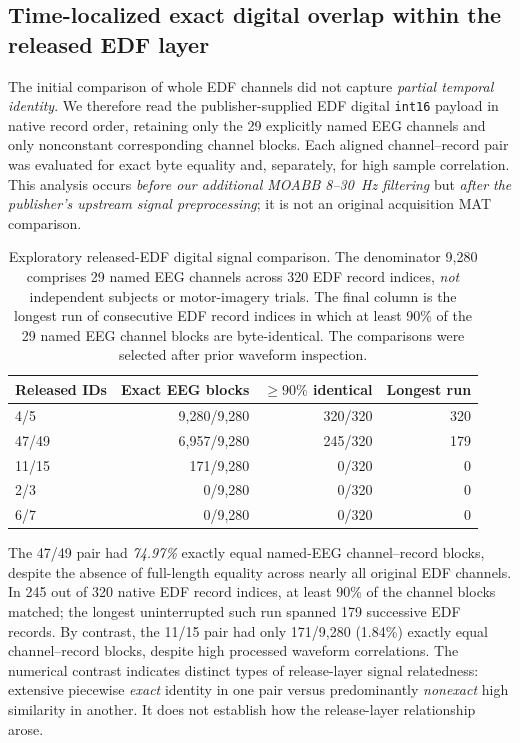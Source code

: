 \subsection{Time-localized exact digital overlap within the released EDF layer}
\label{sec:p2-time-localised-block-overlap}
The initial comparison of whole EDF channels did not capture
\emph{partial temporal identity}. We therefore read the
publisher-supplied EDF digital \texttt{int16} payload in
native record order, retaining only the 29 explicitly named EEG
channels and only nonconstant corresponding channel blocks.
Each aligned channel--record pair was evaluated for exact
byte equality and, separately, for high sample correlation.
This analysis occurs \emph{before our additional MOABB
8--30~Hz filtering} but \emph{after the publisher's
upstream signal preprocessing}; it is not an original
acquisition MAT comparison.

\begin{table}[tb]
\centering\small
\caption{Exploratory released-EDF digital signal comparison.
The denominator 9,280 comprises 29 named EEG channels across
320 EDF record indices, \emph{not} independent subjects or
motor-imagery trials. The final column is the longest run
of consecutive EDF record indices in which at least
90\% of the 29 named EEG channel blocks are byte-identical.
The comparisons were selected after prior waveform inspection.}
\label{tab:p2-temporal-exact-edf}
\setlength{\tabcolsep}{4pt}
\begin{tabular}{lrrr}
\toprule
Released IDs & Exact EEG blocks & $\geq90\%$ identical & Longest run\\
\midrule
4/5    & 9,280/9,280 & 320/320 & 320\\
47/49  & 6,957/9,280 & 245/320 & 179\\
11/15  & 171/9,280   & 0/320   & 0\\
2/3    & 0/9,280     & 0/320   & 0\\
6/7    & 0/9,280     & 0/320   & 0\\
\bottomrule
\end{tabular}
\end{table}

The 47/49 pair had \emph{74.97\%} exactly equal
named-EEG channel--record blocks, despite the absence
of full-length equality across nearly all original
EDF channels. In 245 out of 320 native EDF record
indices, at least 90\% of the channel blocks
matched; the longest uninterrupted such run
spanned 179 successive EDF records.
By contrast, the 11/15 pair had only 171/9,280
(1.84\%) exactly equal channel--record blocks,
despite high processed waveform correlations.
The numerical contrast indicates distinct types
of release-layer signal relatedness: extensive
piecewise \emph{exact} identity in one pair versus
predominantly \emph{nonexact} high similarity
in another. It does not establish how the
release-layer relationship arose.

